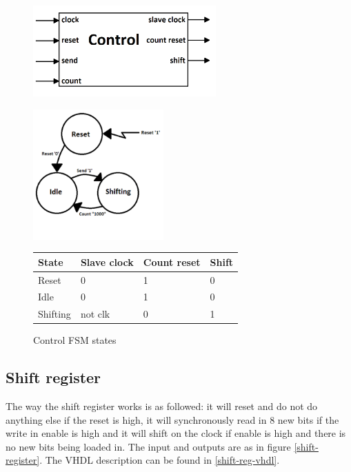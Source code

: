 \documentclass[11pt,twoside,a4paper]{article}
\begin{document}
\begin{figure}[H]
\centering
\begin{minipage}{.5\textwidth}
  \centering
  \includegraphics[width=7cm]{./control_diagram}
  \label{control-diagram}
\end{minipage}%
\begin{minipage}{.5\textwidth}
  \centering
  \includegraphics[width=5cm]{./control_fsm}
  \label{control-fsm}
\end{minipage}
\end{figure}

\begin{figure}[H]
\begin{center}
    \begin{tabular}{ | l | l | l | l |}
    \hline
    State & Slave clock & Count reset & Shift \\ \hline
    Reset & 0 & 1 & 0 \\ \hline
    Idle & 0 & 1 & 0 \\ \hline
    Shifting & not clk  & 0 & 1 \\
    \hline
    \end{tabular}
\end{center}
\caption{Control FSM states}
\label{control-states}
\end{figure}

\subsection{Shift register}
The way the shift register works is as followed: it will reset and do not do anything else if the reset is high, it will synchronously read in 8 new bits if the write in enable is high and it will shift on the clock if enable is high and there is no new bits being loaded in. The input and outputs are as in figure \ref{shift-register}. The VHDL description can be found in \ref{shift-reg-vhdl}.
\end{document}
